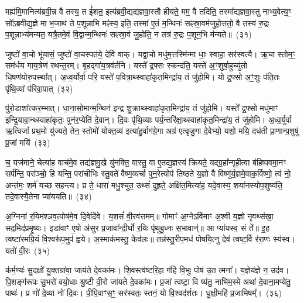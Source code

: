 मह्य॑मि॒मानित्य॑ब्रवी॒न्न वै तस्य॒ त ई॑शत॒ इत्य॑ब्रवी॒द्यद्य॑ज्ञवा॒स्तौ हीय॑ते॒ मम॒ वै तदिति॒ तस्मा᳚द्यज्ञवा॒स्तु नाभ्य॒वेत्य॒ꣳ॒ सो᳚\-ऽब्रवीद्य॒ज्ञे मा भ॒जाथ॑ ते प॒शून्नाभि मꣴ॑स्य॒ इति॒ तस्मा॑ ए॒तं म॒न्थिनः॑ सꣴस्रा॒वम॑जुहो॒त्ततो॒ वै तस्य॑ रु॒द्रः प॒शून्नाभ्य॑मन्यत॒ यत्रै॒तमे॒वं वि॒द्वान्म॒न्थिनः॑ सꣴस्रा॒वं जु॒होति॒ न तत्र॑ रु॒द्रः प॒शून॒भि म॑न्यते॥~(३१)

{}%

जुष्टो॑ वा॒चो भू॑यासं॒ जुष्टो॑ वा॒चस्पत॑ये॒ देवि॑ वाक्। यद्वा॒चो मधु॑म॒त्तस्मि॑न्मा धाः॒ स्वाहा॒ सर॑स्वत्यै। ऋ॒चा स्तोम॒ꣳ॒ सम॑र्धय गाय॒त्रेण॑ रथन्त॒रम्। बृ॒हद्गा॑य॒त्रव॑र्तनि। यस्ते᳚ द्र॒फ्सः स्कन्द॑ति॒ यस्ते॑ अ॒ꣳ॒शुर्बा॒हुच्यु॑तो धि॒षण॑योरु॒पस्था᳚त्। अ॒ध्व॒र्योर्वा॒ परि॒ यस्ते॑ प॒वित्रा॒थ्\-स्वाहा॑कृत॒मिन्द्रा॑य॒ तं जु॑होमि। यो द्र॒फ्सो अ॒ꣳ॒शुः प॑ति॒तः पृ॑थि॒व्यां प॑रिवा॒पात्~(३२)

पु॑रो॒डाशा᳚त्कर॒म्भात्। धा॒ना॒सो॒मान्म॒न्थिन॑ इन्द्र शु॒क्राथ्\-स्वाहा॑कृत॒मिन्द्रा॑य॒ तं जु॑होमि। यस्ते᳚ द्र॒फ्सो मधु॑माꣳ इन्द्रि॒यावा॒न्थ्\-स्वाहा॑कृतः॒ पुन॑र॒प्येति॑ दे॒वान्। दि॒वः पृ॑थि॒व्याः पर्य॒न्तरि॑क्षा॒थ्\-स्वाहा॑कृत॒मिन्द्रा॑य॒ तं जु॑होमि। अ॒ध्व॒र्युर्वा ऋ॒त्विजां᳚ प्रथ॒मो यु॑ज्यते॒ तेन॒ स्तोमो॑ योक्त॒व्य॑ इत्या॑हु॒र्वाग॑ग्रे॒गा अग्र॑ एत्वृजु॒गा दे॒वेभ्यो॒ यशो॒ मयि॒ दध॑ती प्रा॒णान्प॒शुषु॑ प्र॒जां मयि॑~(३३)

च॒ यज॑माने॒ चेत्या॑ह॒ वाच॑मे॒व तद्य॑ज्ञमु॒खे यु॑नक्ति॒ वास्तु॒ वा ए॒तद्य॒ज्ञस्य॑ क्रियते॒ यद्ग्र॒हा᳚न्गृही॒त्वा ब॑हिष्पवमा॒नꣳ सर्प॑न्ति॒ परा᳚ञ्चो॒ हि यन्ति॒ परा॑चीभिः स्तु॒वते॑ वैष्ण॒व्यर्चा पुन॒रेत्योप॑ तिष्ठते य॒ज्ञो वै विष्णु॑र्य॒ज्ञमे॒वाक॒र्विष्णो॒ त्वं नो॒ अन्त॑मः॒ शर्म॑ यच्छ सहन्त्य। प्र ते॒ धारा॑ मधु॒श्चुत॒ उथ्सं॑ दुह्रते॒ अक्षि॑त॒मित्या॑ह॒ यदे॒वास्य॒ शया॑नस्योप॒शुष्य॑ति॒ तदे॒वास्यै॒तेना प्या॑ययति॥~(३४)

{\anuvakamend[{प॒रि॒वा॒पात्प्र॒जां मयि॑ दुह्रते॒ चतु॑र्दश च}]}%

अ॒ग्निना॑ र॒यिम॑श्ञव॒त्पोष॑मे॒व दि॒वेदि॑वे। य॒शसं॑ वी॒रव॑त्तमम्॥ गोमाꣳ॑ अ॒ग्ने\-ऽवि॑माꣳ अ॒श्वी य॒ज्ञो नृ॒वथ्स॑खा॒ सद॒मिद॑प्रमृ॒ष्यः। इडा॑वाꣳ ए॒षो अ॑सुर प्र॒जावा᳚न्दी॒र्घो र॒यिः पृ॑थुबु॒ध्नः स॒भावान्॑॥ आ प्या॑यस्व॒ सं ते᳚॥ इ॒ह त्वष्टा॑रमग्रि॒यं वि॒श्वरू॑प॒मुप॑ ह्वये। अ॒स्माक॑मस्तु॒ केव॑लः॥ तन्न॑स्तु॒रीप॒मध॑ पोषयि॒त्नु देव॑ त्वष्ट॒र्वि र॑रा॒णः स्य॑स्व। यतो॑ वी॒रः~(३५)

क॑र्म॒ण्यः॑ सु॒दक्षो॑ यु॒क्तग्रा॑वा॒ जाय॑ते दे॒वका॑मः। शि॒वस्त्व॑ष्टरि॒हा ग॑हि वि॒भुः पोष॑ उ॒त त्मना᳚। य॒ज्ञेय॑ज्ञे न॒ उद॑व। पि॒शङ्ग॑रूपः सु॒भरो॑ वयो॒धाः श्रु॒ष्टी वी॒रो जा॑यते दे॒वका॑मः। प्र॒जां त्वष्टा॒ वि ष्य॑तु॒ नाभि॑म॒स्मे अथा॑ दे॒वाना॒मप्ये॑तु॒ पाथः॑। प्र णो॑ दे॒व्या नो॑ दि॒वः। पी॒पि॒वाꣳस॒ꣳ॒ सर॑स्वतः॒ स्तनं॒ यो वि॒श्वद॑र्\mbox{}शतः। धु॒क्षी॒महि॑ प्र॒जामिषम्᳚।~(३६)

